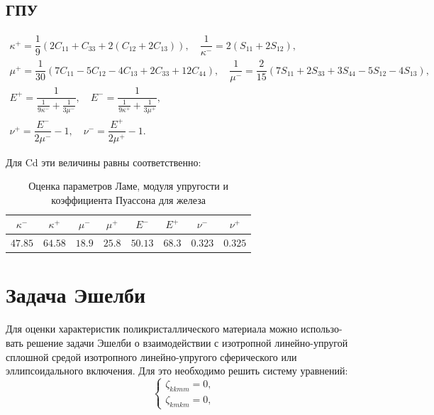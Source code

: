 \documentclass[12pt,a4paper]{article}
\begin{document}
 \subsection{ГПУ}
 \begin{gather*}
    \kappa^+ = \dfrac{1}{9}(2C_{11} + C_{33} + 2(C_{12} + 2C_{13})), \quad \dfrac{1}{\kappa^-} = 2(S_{11} + 2S_{12}),
    \\[0.7em]
    \mu^+ = \dfrac{1}{30}(7C_{11} - 5C_{12} - 4C_{13} + 2C_{33} + 12C_{44}), \quad \dfrac{1}{\mu^-} = \dfrac{2}{15}(7S_{11} + 2S_{33} + 3S_{44} - 5S_{12} - 4S_{13}),
    \\[0.7em]
    E^+ = \dfrac{1}{\tfrac{1}{9 \kappa^-} + \tfrac{1}{3\mu^-}}, \quad E^- = \dfrac{1}{\tfrac{1}{9 \kappa^+} + \tfrac{1}{3\mu^+}},
    \\[0.7em]
    \nu^+ = \dfrac{E^-}{2\mu^-} - 1, \quad \nu^- = \dfrac{E^+}{2\mu^+} - 1.
 \end{gather*}

 \pagebreak

 Для Cd эти величины равны соответственно: 
 \begin{table}[h!]
    \centering
    \caption{Оценка параметров Ламе, модуля упругости и коэффициента Пуассона для железа}
    \vspace{3mm}
    \begin{tabular}{|c|c|c|c|c|c|c|c|}
        \hline 
        $\kappa^-$ & $\kappa^+$ & $\mu^-$ & $\mu^+$ & $E^-$ & $E^+$ & $\nu^-$ & $\nu^+$ \\
        \hline 
        $47.85$ & $64.58$ & $18.9$ & $25.8$ & $50.13$ & $68.3$ & $0.323$ & $0.325$ \\
        \hline
    \end{tabular}
 \end{table}

 \section{Задача Эшелби}

 Для оценки характеристик поликристаллического материала можно использо-
вать решение задачи Эшелби о взаимодействии с изотропной линейно-упругой сплошной средой изотропного линейно-упругого сферического или эллипсоидального включения. Для это необходимо решить систему уравнений:
\begin{equation}
    \begin{cases}
        \zeta_{kkmm} = 0, \\
        \zeta_{kmkm} = 0,
    \end{cases}  
    \label{eq:zeta}
\end{equation}
\end{document}
